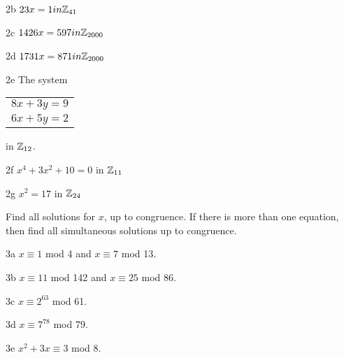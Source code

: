 \begin{question}{2b}
$23x = 1 in \mathbb{Z}_{41}$
\end{question}

\begin{question}{2c}
$1426x = 597 in \mathbb{Z}_{2000}$
\end{question}

\begin{question}{2d}
$1731x = 871 in \mathbb{Z}_{2000}$
\end{question}

\begin{question}{2e}
The system 
\begin{tabular}{l}
$8x + 3y=9$\\
$6x + 5y=2$
\end{tabular}
in $\mathbb{Z}_{12}$.

\end{question}

\begin{question}{2f}
$x^4 + 3x^2 +10 = 0$ in $\mathbb{Z}_{11}$
\end{question}

\begin{question}{2g}
$x^2 = 17$ in $\mathbb{Z}_{24}$
\end{question}



\begin{question}{3}
Find all solutions for $x$, up to congruence. If there is more than one equation, then find all simultaneous solutions up to congruence.
\end{question}


\begin{question}{3a}
$x \equiv 1$ mod 4 and $x \equiv 7$ mod 13.
\end{question}

\begin{question}{3b}
$x \equiv 11$ mod 142 and $x \equiv 25$ mod 86.
\end{question}

\begin{question}{3c}
$x \equiv 2^{63}$ mod 61.
\end{question}

\begin{question}{3d}
$x \equiv 7^{78}$ mod 79.
\end{question}

\begin{question}{3e}
$x^2 + 3x \equiv 3$ mod 8.
\end{question}

